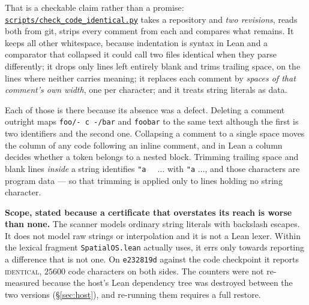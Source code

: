 \documentclass[11pt]{article}
\theoremstyle{definition}
\newcommand{\anchor}{2d0346b2cc75d1cdf2e0ea0cefea4a8ef3be9c84}
\newcommand{\repofile}[2]{%
  \href{https://github.com/lluiseriksson/THE-ERIKSSON-PROGRAMME/blob/\anchor/#1}{\nolinkurl{#2}}}
\begin{document}
That is a checkable claim rather than a promise:
\repofile{scripts/check\_code\_identical.py}{scripts/check\_code\_identical.py}
takes a repository and \emph{two revisions}, reads both from git, strips every
comment from each and compares what remains.  It keeps all other whitespace,
because indentation is syntax in Lean and a comparator that collapsed it could
call two files identical when they parse differently; it drops only lines left
entirely blank and trims trailing space, on the lines where neither carries
meaning; it
replaces each comment by \emph{spaces of that comment's own width}, one per
character; and it treats string literals as data.

Each of those is there because its absence was a defect.  Deleting a comment
outright maps \verb|foo/- c -/bar| and \verb|foobar| to the same text although
the first is two identifiers and the second one.  Collapsing a comment to a
single space moves the column of any code following an inline comment, and in
Lean a column decides whether a token belongs to a nested block.  Trimming
trailing space and blank lines \emph{inside} a string identifies \verb|"a  |
$\ldots$ with \verb|"a| $\ldots$, and those characters are program data --- so
that trimming is applied only to lines holding no string character.

\textbf{Scope, stated because a certificate that overstates its reach is worse
than none.}  The scanner models ordinary string literals with backslash escapes.
It does not model raw strings or interpolation and it is not a Lean lexer.
Within the lexical fragment \texttt{SpatialOS.lean} actually uses, it errs only
towards reporting a difference that is not one.  On \texttt{e232819d} against the
code checkpoint it reports \textsc{identical}, $25600$ code characters on both
sides.  The counters were not re-measured because the
host's Lean dependency tree was destroyed between the two versions
(\S\ref{sec:host}), and re-running them requires a full restore.
\end{document}
